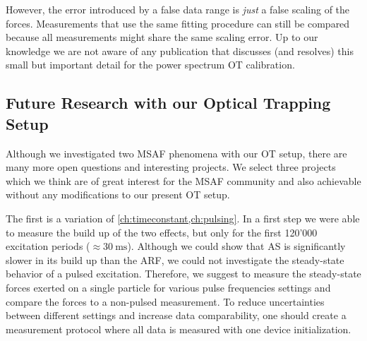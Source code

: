 However, the error introduced by a false data range is \emph{just} a false 
scaling of the forces. Measurements that use the same fitting procedure can 
still be compared because all measurements might share the same scaling error. 
Up to our knowledge we are not aware of any publication that discusses (and 
resolves) this small but important detail for the power spectrum OT 
calibration.

\subsection{Future Research with our Optical Trapping Setup}

Although we investigated two MSAF phenomena with our OT setup, there are many 
more open questions and interesting projects. We select three projects which we 
think are of great interest for the MSAF community and also achievable without 
any modifications to our present OT setup.

The first is a variation of \cref{ch:timeconstant,ch:pulsing}. In a first step 
we were able to measure the build up of the two effects, but only for the first 
120'000 excitation periods ($\approx \SI{30}{\ms}$). Although we could show 
that AS is significantly slower in its build up than the ARF, we could not 
investigate the steady-state behavior of a pulsed excitation. Therefore, we 
suggest to measure the steady-state forces exerted on a single particle for 
various pulse frequencies settings and compare the forces to a non-pulsed 
measurement. To reduce uncertainties between different settings and increase 
data comparability, one should create a measurement protocol where all data is 
measured with one device initialization.


